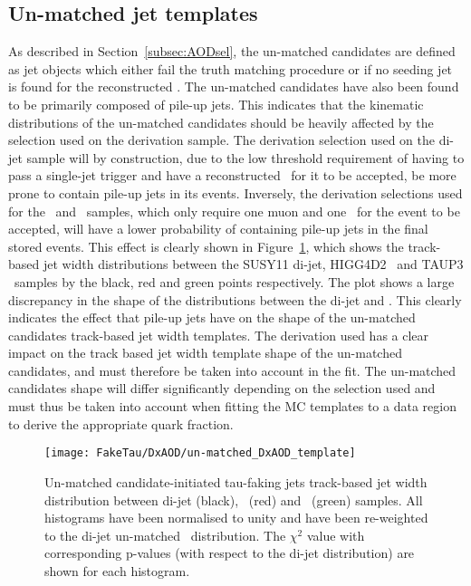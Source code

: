 	\subsection{Un-matched jet templates}
	As described in Section~\ref{subsec:AODsel}, the un-matched candidates are defined as jet objects which either fail the truth matching procedure or if no seeding jet is found for the reconstructed \htau. 
	The un-matched candidates have also been found to be primarily composed of pile-up jets. 
	This indicates that the kinematic distributions of the un-matched candidates should be heavily affected by the selection used on the derivation sample.
	The derivation selection used on the di-jet sample will by construction, due to the low threshold requirement of having to pass a single-jet trigger and have a reconstructed \htau\ for it to be accepted, be more prone to contain pile-up jets in its events. 
	Inversely, the derivation selections used for the \Zjets\ and \ttbar\ samples, which only require one muon and one \htau\ for the event to be accepted, will have a lower probability of containing pile-up jets in the final stored events. 
	This effect is clearly shown in Figure~\ref{fig:unmatched_DxAOD_template}, which shows the track-based jet width distributions between the SUSY11 di-jet, HIGG4D2 \Zjets\ and TAUP3 \ttbar\ samples by the black, red and green points respectively. 
	The plot shows a large discrepancy in the shape of the distributions between the di-jet and \Zjets. This clearly indicates the effect that pile-up jets have on the shape of the un-matched candidates track-based jet width templates. The derivation used has a clear impact on the track based jet width template shape of the un-matched candidates, and must therefore be taken into account in the fit. The un-matched candidates shape will differ significantly depending on the selection used and must thus be taken into account when fitting the \ac{MC} templates to a data region to derive the appropriate quark fraction.
	\label{subsec:FTTFunmatch}
	\begin{figure}[!hbt]
	\centering
	\texttt{[image: FakeTau/DxAOD/un-matched\_DxAOD\_template]}
	\caption{Un-matched candidate-initiated tau-faking jets track-based jet width distribution between di-jet (black), \Zjets\ (red) and \ttbar\ (green) samples. All histograms have been normalised to unity and have been re-weighted to the di-jet un-matched \pt\ distribution. The $\chi^2$ value with corresponding p-values (with respect to the di-jet distribution) are shown for each histogram.}
	\label{fig:unmatched_DxAOD_template}
	\end{figure}	
	
